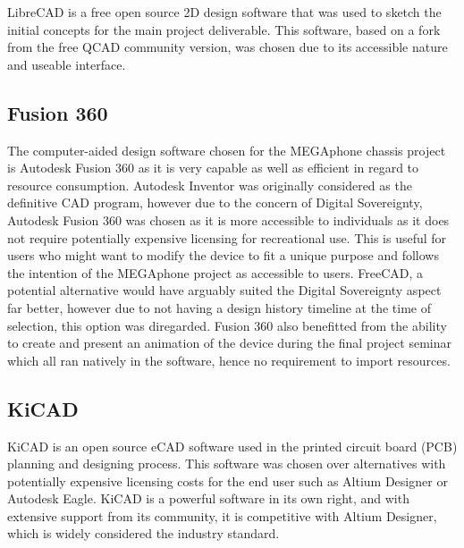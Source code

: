 LibreCAD is a free open source 2D design software that was used to sketch the initial concepts for the main project deliverable. 
This software, based on a fork from the free QCAD community version, was chosen due to its accessible nature and useable interface.


\subsection{Fusion 360}

The computer-aided design software chosen for the MEGAphone chassis project is Autodesk Fusion 360 as it is very capable as well as efficient in regard to resource consumption. 
Autodesk Inventor was originally considered as the definitive CAD program, however due to the concern of Digital Sovereignty, Autodesk Fusion 360 was chosen as it is more accessible to individuals as it does not require potentially expensive licensing for recreational use. 
This is useful for users who might want to modify the device to fit a unique purpose and follows the intention of the MEGAphone project as accessible to users.
FreeCAD, a potential alternative would have arguably suited the Digital Sovereignty aspect far better, however due to not having a design history timeline at the time of selection, this option was diregarded.
Fusion 360 also benefitted from the ability to create and present an animation of the device during the final project seminar which all ran natively in the software, hence no requirement to import resources.


\subsection{KiCAD}

KiCAD is an open source eCAD software used in the printed circuit board (PCB) planning and designing process.
This software was chosen over alternatives with potentially expensive licensing costs for the end user such as Altium Designer or Autodesk Eagle.
KiCAD is a powerful software in its own right, and with extensive support from its community, it is competitive with Altium Designer, which is widely considered the industry standard.


